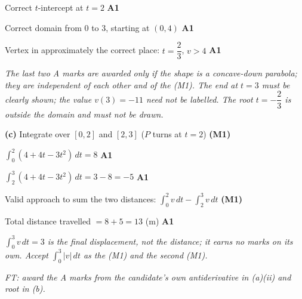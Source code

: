 \documentclass[12pt, twoside]{article}
\begin{document}
\begin{enumerate}[itemsep=0.3cm]
\begin{center}
\end{center}

Correct $t$-intercept at $t = 2$ \hfill \textbf{A1}

Correct domain from $0$ to $3$, starting at $(0, 4)$ \hfill \textbf{A1}

Vertex in approximately the correct place: $t = \dfrac{2}{3}$, $v > 4$
\hfill \textbf{A1}

\emph{The last two A marks are awarded only if the shape is a concave-down
parabola; they are independent of each other and of the (M1). The end at
$t = 3$ must be clearly shown; the value $v(3) = -11$ need not be labelled.
The root $t = -\dfrac{2}{3}$ is outside the domain and must not be drawn.}

\medskip

\textbf{(c)} Integrate over $[0, 2]$ and $[2, 3]$ ($P$ turns at $t = 2$)
\hfill \textbf{(M1)}

$\displaystyle\int_{0}^{2}(4 + 4t - 3t^{2})\, dt = 8$ \hfill \textbf{A1}

$\displaystyle\int_{2}^{3}(4 + 4t - 3t^{2})\, dt = 3 - 8 = -5$
\hfill \textbf{A1}

Valid approach to sum the two distances:
$\displaystyle\int_{0}^{2} v\, dt - \int_{2}^{3} v\, dt$ \hfill \textbf{(M1)}

Total distance travelled $= 8 + 5 = 13$ (m) \hfill \textbf{A1}

\emph{$\displaystyle\int_{0}^{3} v\, dt = 3$ is the final displacement, not the
distance; it earns no marks on its own. Accept $\displaystyle\int_{0}^{3}|v|\, dt$
as the (M1) and the second (M1).}

\emph{FT: award the A marks from the candidate's own antiderivative in
(a)(ii) and root in (b).}


\end{enumerate}
\end{document}
